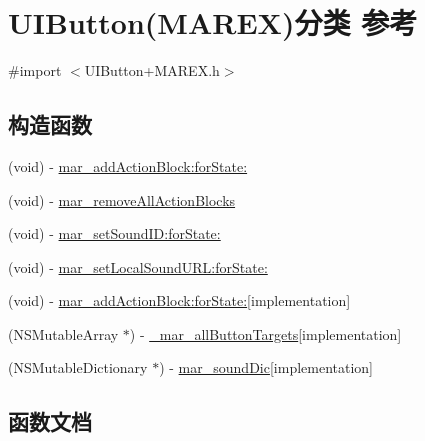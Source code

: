 \hypertarget{category_u_i_button_07_m_a_r_e_x_08}{}\section{U\+I\+Button(M\+A\+R\+EX)分类 参考}
\label{category_u_i_button_07_m_a_r_e_x_08}


{\ttfamily \#import $<$U\+I\+Button+\+M\+A\+R\+E\+X.\+h$>$}

\subsection*{构造函数}
\begin{DoxyCompactItemize}
\item 
(void) -\/ \hyperlink{category_u_i_button_07_m_a_r_e_x_08_a13aef7895a302e3b7297d668315b598b}{mar\+\_\+add\+Action\+Block\+:for\+State\+:}
\item 
(void) -\/ \hyperlink{category_u_i_button_07_m_a_r_e_x_08_a68154e6282f9c0199e26cfcd7bb3e746}{mar\+\_\+remove\+All\+Action\+Blocks}
\item 
(void) -\/ \hyperlink{category_u_i_button_07_m_a_r_e_x_08_ab84349873bcf33b8bba24c8307c6dd9a}{mar\+\_\+set\+Sound\+I\+D\+:for\+State\+:}
\item 
(void) -\/ \hyperlink{category_u_i_button_07_m_a_r_e_x_08_a455674daac47165db833de231b2184de}{mar\+\_\+set\+Local\+Sound\+U\+R\+L\+:for\+State\+:}
\item 
(void) -\/ \hyperlink{category_u_i_button_07_m_a_r_e_x_08_a0eab3a4e54b77dd07fc58fd6115737ba}{mar\+\_\+add\+Action\+Block\+:for\+State\+:}{\ttfamily  \mbox{[}implementation\mbox{]}}
\item 
(N\+S\+Mutable\+Array $\ast$) -\/ \hyperlink{category_u_i_button_07_m_a_r_e_x_08_a890943de6f7fca40a16ed51035089633}{\+\_\+mar\+\_\+all\+Button\+Targets}{\ttfamily  \mbox{[}implementation\mbox{]}}
\item 
(N\+S\+Mutable\+Dictionary $\ast$) -\/ \hyperlink{category_u_i_button_07_m_a_r_e_x_08_a18818ff6ae140137bf37b9f5ee2783d4}{mar\+\_\+sound\+Dic}{\ttfamily  \mbox{[}implementation\mbox{]}}
\end{DoxyCompactItemize}


\subsection{函数文档}
\mbox{\label{category_u_i_button_07_m_a_r_e_x_08_a890943de6f7fca40a16ed51035089633}} 
